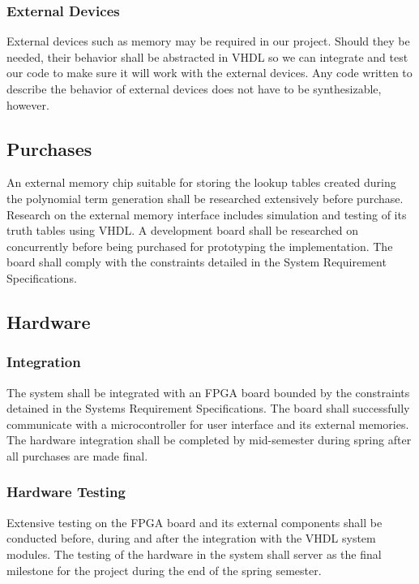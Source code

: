 \documentclass[12pt]{extarticle}
\begin{document}
            \subsubsection{External Devices} External devices such as memory
            may be required in our project. Should they be needed, their
            behavior shall be abstracted in VHDL so we can integrate and test
            our code to make sure it will work with the external devices. Any
            code written to describe the behavior of external devices does not
            have to be synthesizable, however.

        \subsection{Purchases} An external memory chip suitable for storing the
        lookup tables created during the polynomial term generation shall be
        researched extensively before purchase. Research on the external memory
        interface includes simulation and testing of its truth tables using
        VHDL. A development board shall be researched on concurrently before
        being purchased for prototyping the implementation. The board shall
        comply with the constraints detailed in the System Requirement
        Specifications.

        \subsection{Hardware}

            \subsubsection{Integration} The system shall be integrated with an
            FPGA board bounded by the constraints detained in the Systems
            Requirement Specifications. The board shall successfully
            communicate with a microcontroller for user interface and its
            external memories. The hardware integration shall be completed by
            mid-semester during spring after all purchases are made final.

            \subsubsection{Hardware Testing} Extensive testing on the FPGA
            board and its external components shall be conducted before, during
            and after the integration with the VHDL system modules. The testing
            of the hardware in the system shall server as the final milestone
            for the project during the end of the spring semester.
\end{document}
